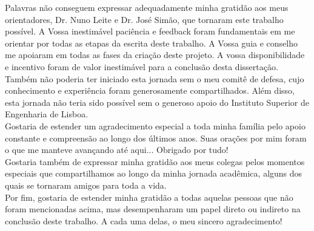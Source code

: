 \dedicatory

Palavras não conseguem expressar adequadamente minha gratidão aos meus orientadores, Dr. Nuno Leite e Dr. José Simão, que tornaram este trabalho possível. A Vossa inestimável paciência e feedback foram fundamentais em me orientar por todas as etapas da escrita deste trabalho. A Vossa guia e conselho me apoiaram em todas as fases da criação deste projeto. A vossa disponibilidade e incentivo foram de valor inestimável para a conclusão desta dissertação.\\

Também não poderia ter iniciado esta jornada sem o meu comitê de defesa, cujo conhecimento e experiência foram generosamente compartilhados. Além disso, esta jornada não teria sido possível sem o generoso apoio do Instituto Superior de Engenharia de Lisboa.\\

Gostaria de estender um agradecimento especial a toda minha família pelo apoio constante e compreensão ao longo dos últimos anos. Suas orações por mim foram o que me manteve avançando até aqui... Obrigado por tudo!\\

Gostaria também de expressar minha gratidão aos meus colegas pelos momentos especiais que compartilhamos ao longo da minha jornada acadêmica, alguns dos quais se tornaram amigos para toda a vida.\\

Por fim, gostaria de estender minha gratidão a todas aquelas pessoas que não foram mencionadas acima, mas desempenharam um papel direto ou indireto na conclusão deste trabalho. A cada uma delas, o meu sincero agradecimento!

\enddedicatory